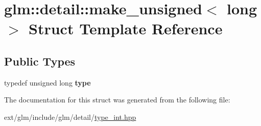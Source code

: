 \hypertarget{structglm_1_1detail_1_1make__unsigned_3_01long_01_4}{\section{glm\-:\-:detail\-:\-:make\-\_\-unsigned$<$ long $>$ Struct Template Reference}
\label{structglm_1_1detail_1_1make__unsigned_3_01long_01_4}
}
\subsection*{Public Types}
\begin{DoxyCompactItemize}
\item 
\hypertarget{structglm_1_1detail_1_1make__unsigned_3_01long_01_4_ade0cc74f63e30969e7d7b42eb6ac8289}{typedef unsigned long {\bfseries type}}\label{structglm_1_1detail_1_1make__unsigned_3_01long_01_4_ade0cc74f63e30969e7d7b42eb6ac8289}

\end{DoxyCompactItemize}


The documentation for this struct was generated from the following file\-:\begin{DoxyCompactItemize}
\item 
ext/glm/include/glm/detail/\hyperlink{type__int_8hpp}{type\-\_\-int.\-hpp}\end{DoxyCompactItemize}

